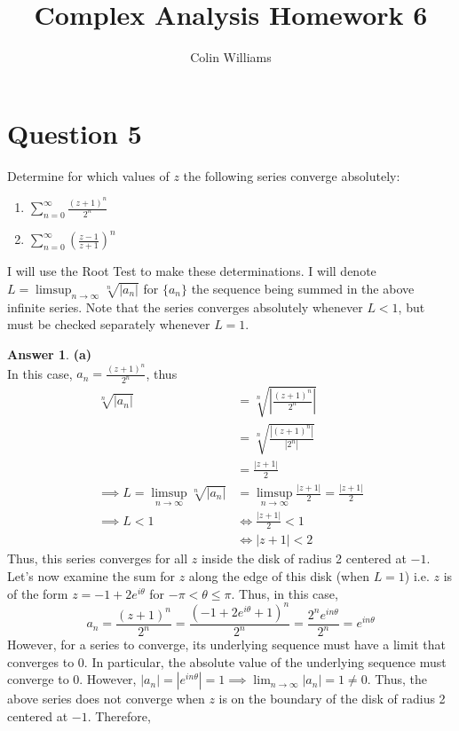\documentclass[10pt,a4paper]{article}
\title{Complex Analysis Homework 6}
\author{Colin Williams}
\theoremstyle{definition}
\newtheorem*{answer*}{Answer}
\begin{document}
\maketitle

\section*{Question 5}
Determine for which values of $z$ the following series converge absolutely:
\begin{enumerate}[label = (\alph*)]
\item $\displaystyle \sum_{n = 0}^{\infty} \frac{(z + 1)^n}{2^n}$
\item $\displaystyle \sum_{n = 0}^{\infty} \left(\frac{z - 1}{z + 1}\right)^n$
\end{enumerate}

I will use the Root Test to make these determinations. I will denote $\displaystyle L = \limsup_{n \to \infty} \sqrt[n]{|a_n|}$ for $\{a_n\}$ the sequence being summed in the above infinite series. Note that the series converges absolutely whenever $L < 1$, but must be checked separately whenever $L = 1$.

\begin{answer*}{\textbf{(a)}}
\\In this case, $\displaystyle a_n = \frac{(z + 1)^n}{2^n}$, thus
\begin{align*}
\sqrt[n]{|a_n|} &= \sqrt[n]{\left|\frac{(z + 1)^n}{2^n}\right|}\\
&= \sqrt[n]{\frac{|(z + 1)^n|}{|2^n|}}\\
&= \frac{|z + 1|}{2}\\
\implies L = \limsup_{n \to \infty} \sqrt[n]{|a_n|} &= \limsup_{n \to \infty} \frac{|z + 1|}{2} = \frac{|z + 1|}{2}\\
\implies L < 1 &\iff \frac{|z + 1|}{2} < 1\\
&\iff |z + 1| < 2
\end{align*}
Thus, this series converges for all $z$ inside the disk of radius 2 centered at $-1$. Let's now examine the sum for $z$ along the edge of this disk (when $L = 1$) i.e. $z$ is of the form $z = -1 + 2e^{i\theta}$ for $-\pi < \theta \leq \pi$. Thus, in this case,
\[a_n = \frac{(z + 1)^n}{2^n} = \frac{(-1 + 2e^{i\theta} + 1)^n}{2^n} = \frac{2^ne^{in\theta}}{2^n} = e^{in\theta}\]
However, for a series to converge, its underlying sequence must have a limit that converges to $0$. In particular, the absolute value of the underlying sequence must converge to $0$. However, $|a_n| = |e^{in\theta}| = 1 \implies \lim_{n \to \infty}|a_n| = 1 \neq 0$. Thus, the above series does not converge when $z$ is on the boundary of the disk of radius 2 centered at $-1$. Therefore, 
\end{answer*}
\end{document}
